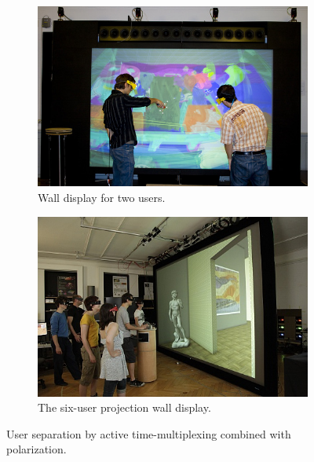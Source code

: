 \begin{figure}[htb]
  \begin{subfigure}{.5\textwidth}
    \centering
    \includegraphics[width=\linewidth]{figures/ch2/multiview_wall}
    \caption{Wall display for two users.}
    \label{fig:2_sep_active_passive:wall}
  \end{subfigure}
  \begin{subfigure}{.5\textwidth}
    \centering
    \includegraphics[width=\linewidth]{figures/ch2/C1x6}
    \caption{The six-user projection wall display.}
    \label{fig:2_sep_active_passive:6user}
  \end{subfigure}
  \caption{\label{fig:2_sep_active_passive}User separation by active time-multiplexing combined with polarization.}
\end{figure}

